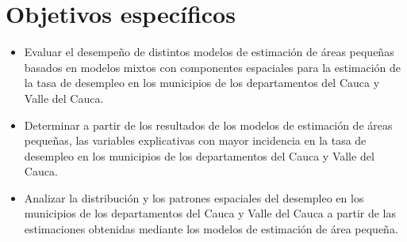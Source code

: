 

\section{Objetivos específicos}

\begin{itemize}
    \item Evaluar el desempeño de distintos modelos de estimación de áreas pequeñas basados en modelos mixtos con componentes espaciales para la estimación de la tasa de desempleo en los municipios de los departamentos del Cauca y Valle del Cauca.

    \item Determinar a partir de los resultados de los modelos de estimación de áreas pequeñas, las variables explicativas con mayor incidencia en la tasa de desempleo en los municipios de los departamentos del Cauca y Valle del Cauca.

    \item Analizar la distribución y los patrones espaciales del desempleo en los municipios de los departamentos del Cauca y Valle del Cauca a partir de las estimaciones obtenidas mediante los modelos de estimación de área pequeña.
\end{itemize}


